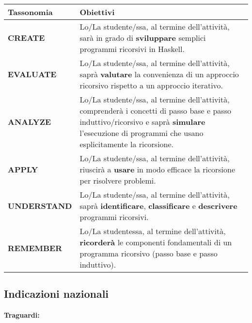 \begin{center}
    \begin{tabular}{ || C{3cm} | >{}p{8.3cm} ||}
    \hline\hline
    \textbf{Tassonomia} & \textbf{Obiettivi}\\ \hline
        \textbf{CREATE} & Lo/La studente/ssa, al termine dell'attività, 
        sarà in grado di \textbf{sviluppare} semplici programmi ricorsivi in Haskell. \\\hline

        \textbf{EVALUATE} & Lo/La studente/ssa, al termine dell'attività,
        saprà \textbf{valutare} la convenienza di un approccio ricorsivo rispetto a un 
        approccio iterativo.\\\hline

        \textbf{ANALYZE} &  Lo/La studente/ssa, al termine dell'attività,
        comprenderà i concetti di passo base e passo induttivo/ricorsivo e 
        saprà \textbf{simulare} l'esecuzione di programmi che usano esplicitamente
        la ricorsione.\\\hline

        \textbf{APPLY} & Lo/La studente/ssa, al termine dell'attività,
        riuscirà a \textbf{usare} in modo efficace la ricorsione per risolvere
        problemi. \\\hline

        \textbf{UNDERSTAND} &  Lo/La studente/ssa, al termine dell'attività,
        saprà \textbf{identificare}, \textbf{classificare} e \textbf{descrivere} programmi ricorsivi. \\\hline

        \textbf{REMEMBER} &  Lo/La studentessa, al termine dell'attività,
        \textbf{ricorderà} le componenti fondamentali di un programma ricorsivo 
        (passo base e passo induttivo).\\\hline

    \hline
    \end{tabular}
\end{center}


\subsection{Indicazioni nazionali}

\paragraph{Traguardi:}

